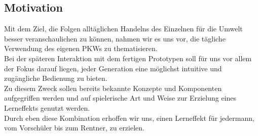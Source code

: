 \documentclass[.../Dokumentation.tex]{subfiles}
\begin{document}
\subsection{Motivation}\label{sec-intr-motivation}
Mit dem Ziel, die Folgen alltäglichen Handelns des Einzelnen für die Umwelt 
besser veranschaulichen zu können, nahmen wir es uns vor, die tägliche 
Verwendung des eigenen PKWs zu thematisieren.\\
Bei der späteren Interaktion mit dem fertigen Prototypen soll für uns vor 
allem der Fokus darauf liegen, jeder Generation eine möglichst intuitive 
und zugängliche Bedienung zu bieten.\\
Zu diesem Zweck sollen bereits bekannte Konzepte und Komponenten aufgegriffen 
werden und auf spielerische Art und Weise zur Erzielung eines Lerneffekts 
genutzt werden. \\
Durch eben diese Kombination erhoffen wir uns, einen Lerneffekt 
für jedermann, vom Vorschüler bis zum Rentner, zu erzielen.
\end{document}
